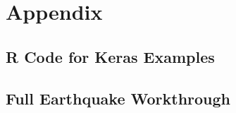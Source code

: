 \appendix

\chapter{Appendix}

\section{R Code for Keras Examples}



\section{Full Earthquake Workthrough}

% 